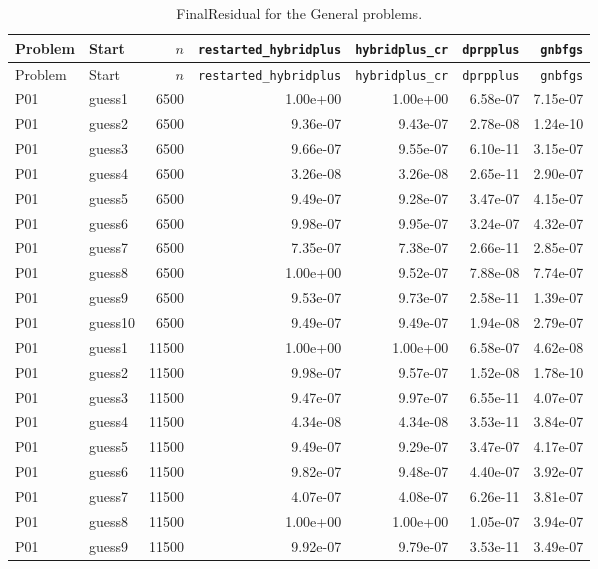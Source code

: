 {\footnotesize
\begin{longtable}{llrrrrr}
\caption{FinalResidual for the General problems.}\label{tab:general_final_residual}\\
\toprule Problem & Start & $n$ & \texttt{restarted\_hybridplus} & \texttt{hybridplus\_cr} & \texttt{dprpplus} & \texttt{gnbfgs} \\
\midrule
\endfirsthead
\toprule Problem & Start & $n$ & \texttt{restarted\_hybridplus} & \texttt{hybridplus\_cr} & \texttt{dprpplus} & \texttt{gnbfgs} \\
\midrule
\endhead
\bottomrule
\endfoot
P01 & guess1 & 6500 & 1.00e+00 & 1.00e+00 & 6.58e-07 & 7.15e-07 \\
P01 & guess2 & 6500 & 9.36e-07 & 9.43e-07 & 2.78e-08 & 1.24e-10 \\
P01 & guess3 & 6500 & 9.66e-07 & 9.55e-07 & 6.10e-11 & 3.15e-07 \\
P01 & guess4 & 6500 & 3.26e-08 & 3.26e-08 & 2.65e-11 & 2.90e-07 \\
P01 & guess5 & 6500 & 9.49e-07 & 9.28e-07 & 3.47e-07 & 4.15e-07 \\
P01 & guess6 & 6500 & 9.98e-07 & 9.95e-07 & 3.24e-07 & 4.32e-07 \\
P01 & guess7 & 6500 & 7.35e-07 & 7.38e-07 & 2.66e-11 & 2.85e-07 \\
P01 & guess8 & 6500 & 1.00e+00 & 9.52e-07 & 7.88e-08 & 7.74e-07 \\
P01 & guess9 & 6500 & 9.53e-07 & 9.73e-07 & 2.58e-11 & 1.39e-07 \\
P01 & guess10 & 6500 & 9.49e-07 & 9.49e-07 & 1.94e-08 & 2.79e-07 \\
P01 & guess1 & 11500 & 1.00e+00 & 1.00e+00 & 6.58e-07 & 4.62e-08 \\
P01 & guess2 & 11500 & 9.98e-07 & 9.57e-07 & 1.52e-08 & 1.78e-10 \\
P01 & guess3 & 11500 & 9.47e-07 & 9.97e-07 & 6.55e-11 & 4.07e-07 \\
P01 & guess4 & 11500 & 4.34e-08 & 4.34e-08 & 3.53e-11 & 3.84e-07 \\
P01 & guess5 & 11500 & 9.49e-07 & 9.29e-07 & 3.47e-07 & 4.17e-07 \\
P01 & guess6 & 11500 & 9.82e-07 & 9.48e-07 & 4.40e-07 & 3.92e-07 \\
P01 & guess7 & 11500 & 4.07e-07 & 4.08e-07 & 6.26e-11 & 3.81e-07 \\
P01 & guess8 & 11500 & 1.00e+00 & 1.00e+00 & 1.05e-07 & 3.94e-07 \\
P01 & guess9 & 11500 & 9.92e-07 & 9.79e-07 & 3.53e-11 & 3.49e-07 \\

\end{longtable}}

